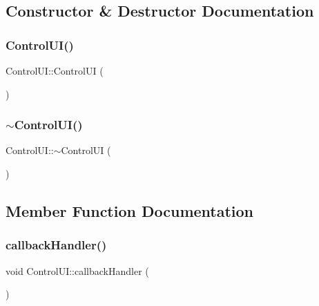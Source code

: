 \subsection{Constructor \& Destructor Documentation}
\mbox{\label{class_control_u_i_ad2a2837a3b055d166b0dfe209545046e}} 
\subsubsection{\texorpdfstring{Control\+U\+I()}{ControlUI()}}
{\footnotesize\ttfamily Control\+U\+I\+::\+Control\+UI (\begin{DoxyParamCaption}{ }\end{DoxyParamCaption})}

\mbox{\label{class_control_u_i_a65f2e6bca109cef29ba350ba2a1580f9}} 
\subsubsection{\texorpdfstring{$\sim$\+Control\+U\+I()}{~ControlUI()}}
{\footnotesize\ttfamily Control\+U\+I\+::$\sim$\+Control\+UI (\begin{DoxyParamCaption}{ }\end{DoxyParamCaption})}



\subsection{Member Function Documentation}
\mbox{\label{class_control_u_i_a951dd8a83c3b93b9231169c6eb33fa82}} 
\subsubsection{\texorpdfstring{callback\+Handler()}{callbackHandler()}}
{\footnotesize\ttfamily void Control\+U\+I\+::callback\+Handler (\begin{DoxyParamCaption}{ }\end{DoxyParamCaption})\hspace{0.3cm}{\ttfamily [private]}}

